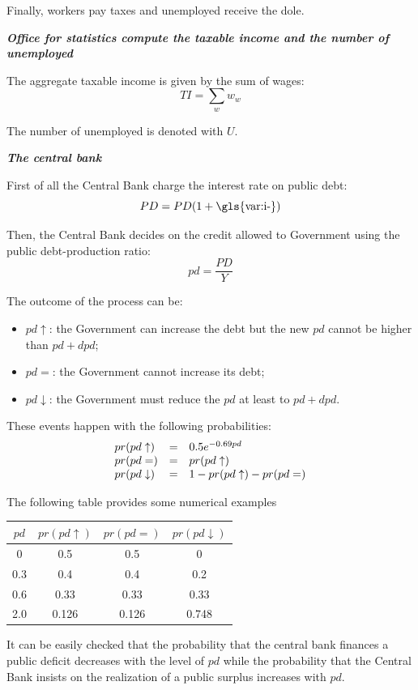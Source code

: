 \documentclass{book}
\begin{document}
Finally, workers pay taxes and unemployed receive the dole.

\vskip5mm
\textit{\textbf{Office for statistics compute the taxable income and the number of unemployed}}

The aggregate taxable income is given by the sum of wages:
\[
TI=\sum_w w_w
\]

The number of unemployed is denoted with $U$.

\vskip5mm
\textit{\textbf{The central bank}}

First of all the Central Bank charge the interest rate on public debt:
\[
	PD=PD(1+\textnormal{\gls{var:i-}})
\]

Then, the Central Bank decides on the credit allowed to Government using the public debt-production ratio:
\[
	pd= \frac{PD}{Y}
\]

The outcome of the process can be:
\begin{itemize}
	\item $pd\uparrow$: the Government can increase the debt but the new $pd$ cannot be higher than $pd+dpd$;
	\item $pd=$: the Government cannot increase its debt;
	\item $pd\downarrow$: the Government must reduce the $pd$ at least to $pd+dpd$.
\end{itemize}
These events happen with the following probabilities:
\[
	\begin{array}{l c l}
	pr(pd\uparrow) & = &0.5 e^{-0.69pd}\\
	pr(pd=) &= &pr(pd\uparrow)\\
	pr(pd\downarrow)&=&1-pr(pd\uparrow)-pr(pd=)
	\end{array}
\]

The following table provides some numerical examples

\begin{center}
\begin{tabular}{c c c c}
	\hline
	$pd$& $pr(pd\uparrow)$ & $pr(pd=)$ & $pr(pd\downarrow)$\\
	\hline
	0   & 0.5 & 0.5 & 0\\
	0.3 & 0.4 & 0.4& 0.2\\
	0.6 & 0.33 & 0.33 & 0.33\\
	2.0 & 0.126 & 0.126 & 0.748\\
	\hline
\end{tabular}
\end{center}
It can be easily checked that the probability that the central bank finances a public deficit decreases with the level of $pd$ while the probability that the Central Bank insists on the realization of a public surplus increases with $pd$.
\end{document}
